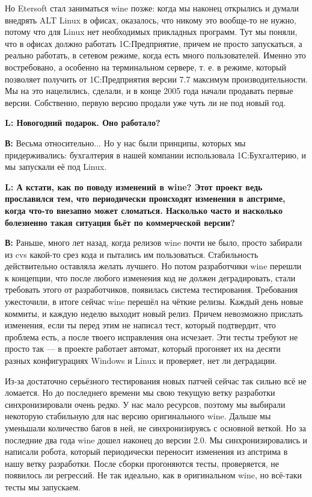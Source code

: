 \documentclass[10pt, a5paper]{article}
\begin{document}
Но Etersoft стал заниматься wine позже: когда мы наконец открылись и думали внедрять ALT Linux в офисах, оказалось, что никому это вообще-то не нужно, потому что для Linux нет необходимых прикладных программ. Тут мы поняли, что в офисах должно работать 1С:Предприятие, причем не просто запускаться, а реально работать, в сетевом режиме, когда есть много пользователей. Именно это востребовано, а особенно на терминальном сервере, т. е. в режиме, который позволяет получить от 1С:Предприятия версии 7.7 максимум производительности. Мы на это нацелились, сделали, и в конце 2005 года начали продавать первые версии. Собственно, первую версию продали уже чуть ли не под новый год.

{\noindent \bf L: Новогодний подарок. Оно работало?}

{\noindent \bf В:} Весьма относительно... Но у нас были принципы, которых мы придерживались:  бухгалтерия в нашей компании использовала 1С:Бухгалтерию, и мы запускали её под Linux.

{\noindent \bf L: А кстати, как по поводу изменений в wine? Этот проект ведь прославился тем, что периодически происходят изменения в апстриме, когда что-то внезапно может сломаться. Насколько часто и насколько болезненно такая ситуация бьёт по коммерческой версии? }

{\noindent \bf В:} Раньше, много лет назад, когда релизов wine почти не было, просто забирали из cvs какой-то срез кода и пытались им пользоваться. Стабильность действительно оставляла желать лучшего. Но потом разработчики wine перешли к концепции, что после любого изменения код не должен деградировать, стали требовать этого от разработчиков, появилась система тестирования. Требования ужесточили, в итоге сейчас wine перешёл на чёткие релизы. Каждый день новые коммиты, и каждую неделю выходит новый релиз. Причем невозможно прислать изменения, если ты перед этим не написал тест, который подтвердит, что  проблема есть, а после твоего исправления она исчезает. Эти тесты требуют не просто так --- в проекте работает автомат, который прогоняет их на десяти разных конфигурациях Windows и Linux и проверяет, нет ли деградации.

Из-за достаточно серьёзного тестирования новых патчей сейчас так сильно всё не ломается. Но до последнего времени мы свою текущую ветку разработки синхронизировали очень редко. У нас мало ресурсов, поэтому мы выбирали некоторую стабильную для нас версию оригинального wine. Дальше мы уменьшали количество багов в ней, не синхронизируясь с основной веткой. Но за последние два года wine дошел наконец до версии 2.0. Мы синхронизировались и написали робота, который периодически  переносит изменения из апстрима в нашу ветку разработки. После сборки прогоняются тесты, проверяется, не появилось ли регрессий. Не так идеально, как в оригинальном wine, но всё-таки тесты мы запускаем.
\end{document}
